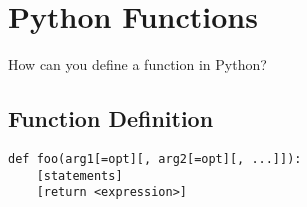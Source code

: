 \section{Python Functions}
How can you define a function in Python?

\subsection{Function Definition}
\begin{verbatim}
def foo(arg1[=opt][, arg2[=opt][, ...]]):
    [statements]
    [return <expression>]
\end{verbatim}